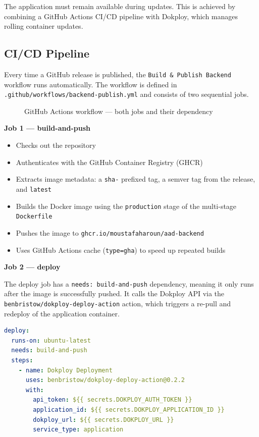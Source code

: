 \documentclass[12pt, a4paper]{article}
\begin{document}
The application must remain available during updates. This is achieved by combining a GitHub Actions CI/CD pipeline with Dokploy, which manages rolling container updates.

\subsection{CI/CD Pipeline}

Every time a GitHub release is published, the \texttt{Build \& Publish Backend} workflow runs automatically. The workflow is defined in \texttt{.github/workflows/backend-publish.yml} and consists of two sequential jobs.

\begin{figure}[H]
    \centering
    \fbox{\rule{0pt}{5cm}\rule{12cm}{0pt}}
    \caption{GitHub Actions workflow — both jobs and their dependency}
    \label{fig:cicd}
\end{figure}

\textbf{Job 1 — build-and-push}

\begin{itemize}
    \item Checks out the repository
    \item Authenticates with the GitHub Container Registry (GHCR)
    \item Extracts image metadata: a \texttt{sha-} prefixed tag, a semver tag from the release, and \texttt{latest}
    \item Builds the Docker image using the \texttt{production} stage of the multi-stage \texttt{Dockerfile}
    \item Pushes the image to \texttt{ghcr.io/moustafaharoun/aad-backend}
    \item Uses GitHub Actions cache (\texttt{type=gha}) to speed up repeated builds
\end{itemize}

\textbf{Job 2 — deploy}

The deploy job has a \texttt{needs: build-and-push} dependency, meaning it only runs after the image is successfully pushed. It calls the Dokploy API via the \texttt{benbristow/dokploy-deploy-action} action, which triggers a re-pull and redeploy of the application container.

\begin{lstlisting}[style=code, language=yaml, caption=deploy job in backend-publish.yml]
deploy:
  runs-on: ubuntu-latest
  needs: build-and-push
  steps:
    - name: Dokploy Deployment
      uses: benbristow/dokploy-deploy-action@0.2.2
      with:
        api_token: ${{ secrets.DOKPLOY_AUTH_TOKEN }}
        application_id: ${{ secrets.DOKPLOY_APPLICATION_ID }}
        dokploy_url: ${{ secrets.DOKPLOY_URL }}
        service_type: application
\end{lstlisting}
\end{document}
